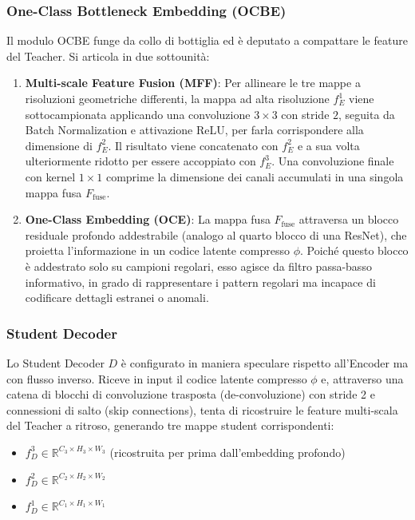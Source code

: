 \subsubsection{One-Class Bottleneck Embedding (OCBE)}
Il modulo OCBE funge da collo di bottiglia ed è deputato a compattare le feature del Teacher. Si articola in due sottounità:
\begin{enumerate}
    \item \textbf{Multi-scale Feature Fusion (MFF)}: Per allineare le tre mappe a risoluzioni geometriche differenti, la mappa ad alta risoluzione $f_E^1$ viene sottocampionata applicando una convoluzione $3 \times 3$ con stride $2$, seguita da Batch Normalization e attivazione ReLU, per farla corrispondere alla dimensione di $f_E^2$. Il risultato viene concatenato con $f_E^2$ e a sua volta ulteriormente ridotto per essere accoppiato con $f_E^3$. Una convoluzione finale con kernel $1 \times 1$ comprime la dimensione dei canali accumulati in una singola mappa fusa $F_{\text{fuse}}$.
    \item \textbf{One-Class Embedding (OCE)}: La mappa fusa $F_{\text{fuse}}$ attraversa un blocco residuale profondo addestrabile (analogo al quarto blocco di una ResNet), che proietta l'informazione in un codice latente compresso $\phi$. Poiché questo blocco è addestrato solo su campioni regolari, esso agisce da filtro passa-basso informativo, in grado di rappresentare i pattern regolari ma incapace di codificare dettagli estranei o anomali.
\end{enumerate}

\subsubsection{Student Decoder}
Lo Student Decoder $D$ è configurato in maniera speculare rispetto all'Encoder ma con flusso inverso. Riceve in input il codice latente compresso $\phi$ e, attraverso una catena di blocchi di convoluzione trasposta (de-convoluzione) con stride 2 e connessioni di salto (skip connections), tenta di ricostruire le feature multi-scala del Teacher a ritroso, generando tre mappe student corrispondenti:
\begin{itemize}
    \item $f_D^3 \in \mathbb{R}^{C_3 \times H_3 \times W_3}$ (ricostruita per prima dall'embedding profondo)
    \item $f_D^2 \in \mathbb{R}^{C_2 \times H_2 \times W_2}$
    \item $f_D^1 \in \mathbb{R}^{C_1 \times H_1 \times W_1}$
\end{itemize}

